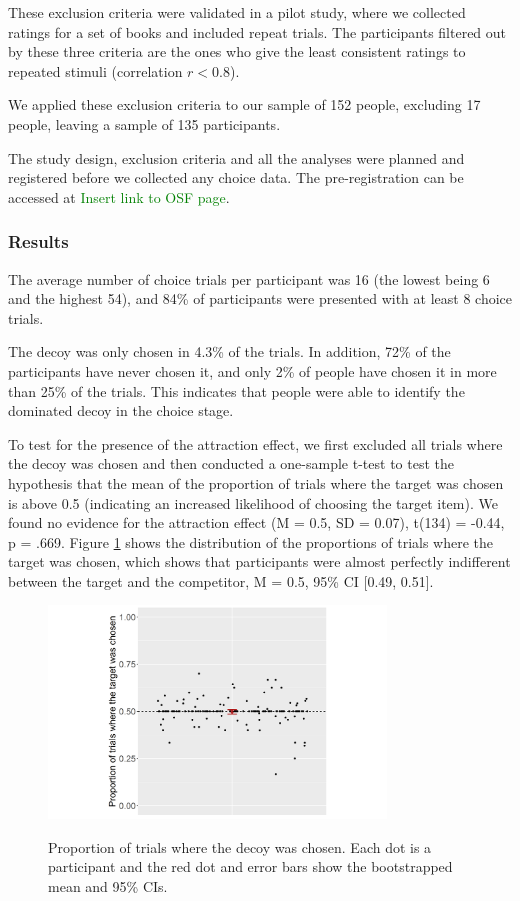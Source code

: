 \documentclass[12pt, a4paper]{article}
\newcommand{\NS}[1] {{\textcolor{green}{#1}}}
\begin{document}
These exclusion criteria were validated in a pilot study, where we collected ratings for a set of books and included repeat trials. The participants filtered out by these three criteria are the ones who give the least consistent ratings to repeated stimuli (correlation $r < 0.8$). 

We applied these exclusion criteria to our sample of 152 people, excluding 17 people, leaving a sample of 135 participants.

The study design, exclusion criteria and all the analyses were planned and registered before we collected any choice data. The pre-registration can be accessed at \NS{Insert link to OSF page}.

\subsubsection{Results}

The average number of choice trials per participant was 16 (the lowest being 6 and the highest 54), and 84\% of participants were presented with at least 8 choice trials.

The decoy was only chosen in 4.3\% of the trials. In addition, 72\% of the participants have never chosen it, and only 2\% of people have chosen it in more than 25\% of the trials. This indicates that people were able to identify the dominated decoy in the choice stage. 

To test for the presence of the attraction effect, we first excluded all trials where the decoy was chosen and then conducted a one-sample t-test to test the hypothesis that the mean of the proportion of trials where the target was chosen is above 0.5 (indicating an increased likelihood of choosing the target item). We found no evidence for the attraction effect (M = 0.5, SD = 0.07), t(134) = -0.44, p = .669. Figure \ref{fig:exp2_res} shows the distribution of the proportions of trials where the target was chosen, which shows that participants were almost perfectly indifferent between the target and the competitor, M = 0.5, 95\% CI [0.49, 0.51].


 
\begin{figure}[htb!]
\centering
\captionsetup{justification=centering}
\caption{Proportion of trials where the decoy was chosen. Each dot is a participant and the red dot and error bars show the bootstrapped mean and 95\% CIs.}
\includegraphics[width=0.8\textwidth]{exp2_res.png}
\label{fig:exp2_res}
\end{figure}
\end{document}
